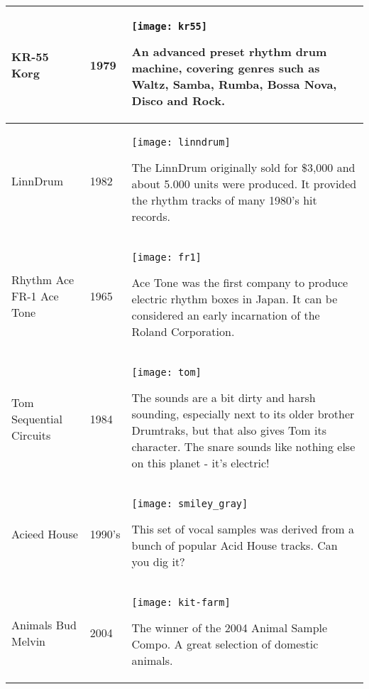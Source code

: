 \begin{xtabular}{p{2.02cm}|l|p{7.8cm}}
\hline
KR-55 \linebreak Korg & 1979 & 
\texttt{[image: kr55]}

An advanced preset rhythm drum machine, covering genres such as Waltz, Samba, Rumba, Bossa Nova, Disco and Rock. \\

\hline
LinnDrum & 1982 & 
\texttt{[image: linndrum]}

The LinnDrum originally sold for \$3,000 and about 5.000 units were produced. It provided the rhythm tracks of many 1980's hit records. \\
\hline
Rhythm Ace \linebreak
FR-1 \linebreak
Ace Tone & 1965 & 
\texttt{[image: fr1]}

Ace Tone was the first company to produce electric rhythm boxes in Japan. It can be considered an early incarnation of the Roland Corporation. \\
\hline
Tom \linebreak
Sequential \linebreak
Circuits & 1984 & 
\texttt{[image: tom]}

The sounds are a bit dirty and harsh sounding, especially next to its older brother Drumtraks, but that also gives Tom its character. The snare sounds like nothing else on this planet - it's electric! \\
\hline
Acieed House & 1990's & 
\texttt{[image: smiley\_gray]}

This set of vocal samples was derived from a bunch of popular Acid House tracks. Can you dig it? \\

\hline
Animals \linebreak Bud Melvin & 2004 & 
\texttt{[image: kit-farm]} 

The winner of the 2004 Animal Sample Compo. A great selection of domestic animals. \\
\end{xtabular}

